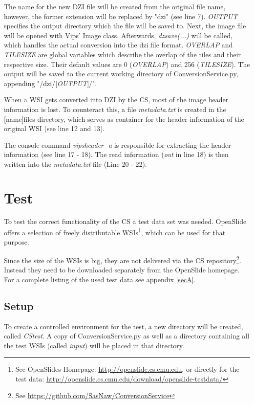 The name for the new DZI file will be created from the original file name, however, the former extension will be replaced by "dzi" (see line 7). \emph{OUTPUT} specifies the output directory which the file will be saved to. Next, the image file will be opened with Vips' Image class. Afterwards, \emph{dzsave(...)} will be called, which handles the actual conversion into the dzi file format. \emph{OVERLAP} and \emph{TILESIZE} are global variables which describe the overlap of the tiles and their respective size. Their default values are 0 (\emph{OVERLAP}) and 256 (\emph{TILESIZE}). The output will be saved to the current working directory of ConversionService.py, appending "/dzi/[\emph{OUTPUT}]/".

When a WSI gets converted into DZI by the CS, most of the image header information is lost. To counteract this, a file \emph{metadata.txt} is created in the [name]{\textunderscore}files directory, which serves as container for the header information of the original WSI (see line 12 and 13).

The console command \emph{vipsheader -a} is responsible for extracting the header information (see line 17 - 18). The read information (\emph{out} in line 18) is then written into the \emph{metadata.txt} file (Line 20 - 22).


\section{Test}
\label{sec3_test}
To test the correct functionality of the CS a test data set was needed. OpenSlide offers a selection of freely distributable WSIs\footnote{See OpenSlides Homepage: \url{http://openslide.cs.cmu.edu}, or directly for the test data: \url{http://openslide.cs.cmu.edu/download/openslide-testdata/}}, which can be used for that purpose.

Since the size of the WSIs is big, they are not delivered via the CS repository\footnote{See \url{https://github.com/SasNaw/ConversionService}}. Instead they need to be downloaded separately from the OpenSlide homepage. For a complete listing of the used test data see appendix \ref{secA}.


\subsection{Setup}

To create a controlled environment for the test, a new directory will be created, called \emph{CS{\textunderscore}test}. A copy of ConversionService.py as well as a directory containing all the test WSIs (called \emph{input}) will be placed in that directory.

